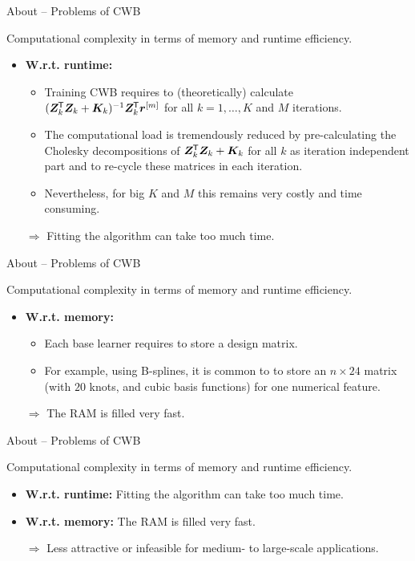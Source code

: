 \documentclass[10pt]{beamer}
\begin{document}
\begin{frame}{About -- Problems of CWB}

  Computational complexity in terms of memory and runtime efficiency.
  \begin{itemize}
    \item \textbf{W.r.t. runtime:}
    \begin{itemize}
      \item Training CWB requires to (theoretically) calculate $(\bm{Z}_k^{\mkern-1.5mu\mathsf{T}} \bm{Z}_k + \bm{K}_k)^{-1}\bm{Z}_k^{\mkern-1.5mu\mathsf{T}} \bm{r}^{[m]}$ for all $k = 1, \dots, K$ and $M$ iterations.
      \item The computational load is tremendously reduced by pre-calculating the Cholesky decompositions of $\bm{Z}_k^{\mkern-1.5mu\mathsf{T}} \bm{Z}_k + \bm{K}_k$ for all $k$ as iteration independent part and to re-cycle these matrices in each iteration.
      \item Nevertheless, for big $K$ and $M$ this remains very costly and time consuming.
    \end{itemize}
    \item[] $\Rightarrow$ Fitting the algorithm can take too much time.
  \end{itemize}
\end{frame}

\begin{frame}{About -- Problems of CWB}

  Computational complexity in terms of memory and runtime efficiency.
  \begin{itemize}
    \item \textbf{W.r.t. memory:}
    \begin{itemize}
      \item Each base learner requires to store a design matrix.
      \item For example, using B-splines, it is common to to store an $n\times 24$ matrix (with $20$ knots, and cubic basis functions) for one numerical feature.
    \end{itemize}
    \item[] $\Rightarrow$ The RAM is filled very fast.
  \end{itemize}
\end{frame}

\begin{frame}{About -- Problems of CWB}

  Computational complexity in terms of memory and runtime efficiency.
  \begin{itemize}
    \item \textbf{W.r.t. runtime:} Fitting the algorithm can take too much time.
    \item \textbf{W.r.t. memory:} The RAM is filled very fast.
  \end{itemize}
  \begin{itemize}
    \item[$\Rightarrow$] Less attractive or infeasible for medium- to large-scale applications.
  \end{itemize}
\end{frame}
\end{document}
